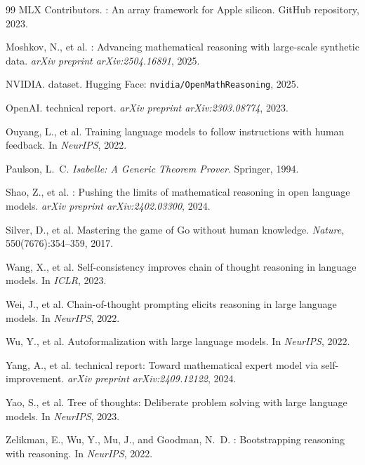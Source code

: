 \documentclass[11pt,a4paper]{article}
\begin{document}
\begin{thebibliography}{99}
MLX Contributors.
: An array framework for {Apple} silicon.
\newblock GitHub repository, 2023.

Moshkov, N., et al.
: Advancing mathematical reasoning with large-scale synthetic data.
\newblock \emph{arXiv preprint arXiv:2504.16891}, 2025.

NVIDIA.
 dataset.
\newblock Hugging Face: \texttt{nvidia/OpenMathReasoning}, 2025.

OpenAI.
 technical report.
\newblock \emph{arXiv preprint arXiv:2303.08774}, 2023.

Ouyang, L., et al.
\newblock Training language models to follow instructions with human feedback.
\newblock In \emph{NeurIPS}, 2022.

Paulson, L.~C.
\newblock \emph{Isabelle: A Generic Theorem Prover}.
\newblock Springer, 1994.

Shao, Z., et al.
: Pushing the limits of mathematical reasoning in open language models.
\newblock \emph{arXiv preprint arXiv:2402.03300}, 2024.

Silver, D., et al.
\newblock Mastering the game of {Go} without human knowledge.
\newblock \emph{Nature}, 550(7676):354--359, 2017.

Wang, X., et al.
\newblock Self-consistency improves chain of thought reasoning in language models.
\newblock In \emph{ICLR}, 2023.

Wei, J., et al.
\newblock Chain-of-thought prompting elicits reasoning in large language models.
\newblock In \emph{NeurIPS}, 2022.

Wu, Y., et al.
\newblock Autoformalization with large language models.
\newblock In \emph{NeurIPS}, 2022.

Yang, A., et al.
 technical report: Toward mathematical expert model via self-improvement.
\newblock \emph{arXiv preprint arXiv:2409.12122}, 2024.

Yao, S., et al.
\newblock Tree of thoughts: Deliberate problem solving with large language models.
\newblock In \emph{NeurIPS}, 2023.

Zelikman, E., Wu, Y., Mu, J., and Goodman, N.~D.
: Bootstrapping reasoning with reasoning.
\newblock In \emph{NeurIPS}, 2022.

\end{thebibliography}
\end{document}
